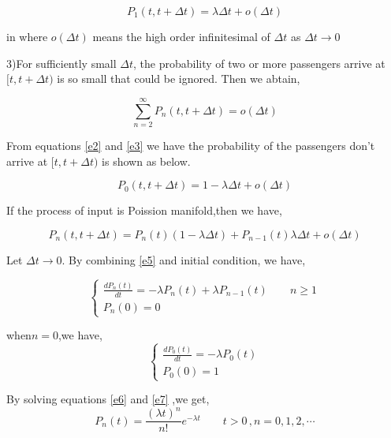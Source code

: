 \documentclass{mcmthesis}
\begin{document}
\begin{equation}
P_1(t,t+\Delta t)=\lambda \Delta t+o(\Delta t)  \label{e2}
\end{equation}

in where $o(\Delta t)$ means the high order infinitesimal of $\Delta t$ as $\Delta t \rightarrow 0$
\par 3)For sufficiently small $\Delta t$, the probability of two or more  passengers arrive at $[t,t+\Delta t)$ is so small that could be ignored. Then we abtain,
 
\begin{equation}  
\sum\limits_{n=2}^\infty P_n(t,t+\Delta t)=o(\Delta t)   \label{e3}
\end{equation}

From equations \eqref{e2} and  \eqref{e3} we have the probability of the  passengers don't arrive at $[t,t+\Delta t)$ is shown as below.

\begin{equation}
P_0(t,t+\Delta t)=1-\lambda \Delta t+o(\Delta t)
\end{equation}


If the process of input is Poission manifold,then we have,

\begin{equation}
P_n(t,t+\Delta t)=P_n(t)(1-\lambda \Delta t)+P_{n-1}(t)\lambda \Delta t+o(\Delta t) \label{e5}
\end{equation}

Let  $\Delta t \rightarrow 0$. By combining \eqref{e5} and initial condition, we have,

\begin{equation}    \label{e6}
\left\{
       \begin{array}{lr}
           \frac {d P_n(t)}{d t}=-\lambda P_n(t)+\lambda P_{n-1}(t)\qquad n\geqslant 1\\
            P_n(0)=0
        \end{array}
\right.
\end{equation}

when$n=0$,we have,
\begin{equation}    \label{e7}
\left\{
       \begin{array}{lr}
           \frac {d P_0(t)}{d t}=-\lambda P_0(t)\\
            P_0(0)=1
        \end{array}
\right.
\end{equation}


By solving equations \eqref{e6} and \eqref{e7} ,we get,
\begin{equation}
 P_n(t)=\frac{(\lambda t)^n}{n!} e^{-\lambda t}\qquad t>0\, , n=0,1,2,\cdots
\end{equation}
\end{document}

